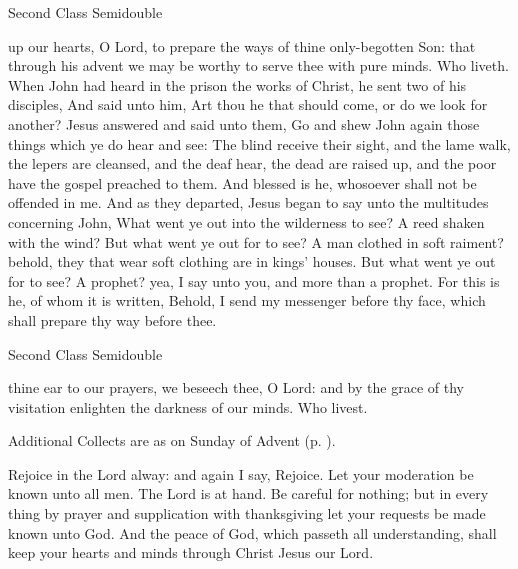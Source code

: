 \begin{inhead}
{Second Class Semidouble}
\end{inhead}

\collect
{} up our hearts, O Lord, to prepare the ways of thine only-begotten Son: that through his advent we may be worthy to serve thee with pure minds. Who liveth.
 When John had heard in the prison the works of Christ, he sent two of his disciples, And said unto him, Art thou he that should come, or do we look for another? Jesus answered and said unto them, Go and shew John again those things which ye do hear and see: The blind receive their sight, and the lame walk, the lepers are cleansed, and the deaf hear, the dead are raised up, and the poor have the gospel preached to them. And blessed is he, whosoever shall not be offended in me. And as they departed, Jesus began to say unto the multitudes concerning John, What went ye out into the wilderness to see? A reed shaken with the wind? But what went ye out for to see? A man clothed in soft raiment? behold, they that wear soft clothing are in kings' houses. But what went ye out for to see? A prophet? yea, I say unto you, and more than a prophet. For this is he, of whom it is written, Behold, I send my messenger before thy face, which shall prepare thy way before thee.

\begin{inhead}
{Second Class Semidouble}
\end{inhead}

\collect
{} thine ear to our prayers, we beseech thee, O Lord: and by the grace of thy visitation enlighten the darkness of our minds. Who livest.
\begin{rubric}
    Additional Collects are as on  Sunday of Advent (p. \pageref{AdventI}).
\end{rubric}
 Rejoice in the Lord alway: and again I say, Rejoice. Let your moderation be known unto all men. The Lord is at hand. Be careful for nothing; but in every thing by prayer and supplication with thanksgiving let your requests be made known unto God. And the peace of God, which passeth all understanding, shall keep your hearts and minds through Christ Jesus our Lord.

